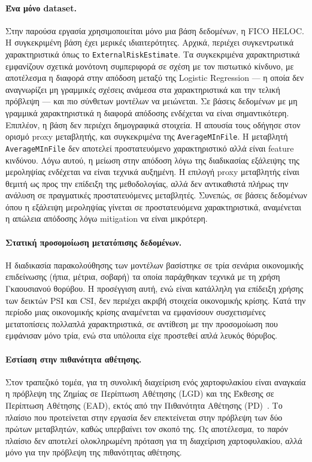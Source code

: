\paragraph{Ένα μόνο dataset.}
Στην παρούσα εργασία χρησιμοποιείται μόνο μια βάση δεδομένων,
η FICO HELOC. Η συγκεκριμένη βάση έχει μερικές ιδιαιτερότητες.
Αρχικά, περιέχει συγκεντρωτικά χαρακτηριστικά όπως το
\texttt{ExternalRiskEstimate}. Τα συγκεκριμένα χαρακτηριστικά
εμφανίζουν σχετικά μονότονη συμπεριφορά σε σχέση με τον
πιστωτικό κίνδυνο, με αποτέλεσμα η διαφορά στην απόδοση μεταξύ
της Logistic Regression --- η οποία δεν αναγνωρίζει μη γραμμικές
σχέσεις ανάμεσα στα χαρακτηριστικά και την τελική πρόβλεψη ---
και πιο σύνθετων μοντέλων να μειώνεται. Σε βάσεις δεδομένων με
μη γραμμικά χαρακτηριστικά η διαφορά απόδοσης ενδέχεται να είναι
σημαντικότερη. Επιπλέον, η βάση δεν περιέχει δημογραφικά στοιχεία.
Η απουσία τους οδήγησε στον ορισμό proxy μεταβλητής, και
συγκεκριμένα της \texttt{AverageMInFile}. Η μεταβλητή
\texttt{AverageMInFile} δεν αποτελεί προστατευόμενο χαρακτηριστικό
αλλά είναι feature κινδύνου. Λόγω αυτού, η μείωση στην απόδοση
λόγω της διαδικασίας εξάλειψης της μεροληψίας ενδέχεται να είναι
τεχνικά αυξημένη. Η επιλογή proxy μεταβλητής είναι θεμιτή ως προς
την επίδειξη της μεθοδολογίας, αλλά δεν αντικαθιστά πλήρως την
ανάλυση σε πραγματικές προστατευόμενες μεταβλητές. Συνεπώς, σε
βάσεις δεδομένων όπου η εξάλειψη μεροληψίας γίνεται σε
προστατευόμενα χαρακτηριστικά, αναμένεται η απώλεια απόδοσης
λόγω mitigation να είναι μικρότερη.

\paragraph{Στατική προσομοίωση μετατόπισης δεδομένων.}
Η διαδικασία παρακολούθησης των μοντέλων βασίστηκε σε τρία
σενάρια οικονομικής επιδείνωσης (ήπια, μέτρια, σοβαρή) τα οποία
παράχθηκαν τεχνικά με τη χρήση Γκαουσιανού θορύβου. Η προσέγγιση
αυτή, ενώ είναι κατάλληλη για επίδειξη χρήσης των δεικτών PSI και
CSI, δεν περιέχει ακριβή στοιχεία οικονομικής κρίσης. Κατά την
περίοδο μιας οικονομικής κρίσης αναμένεται να εμφανίσουν
συσχετισμένες μετατοπίσεις πολλαπλά χαρακτηριστικά, σε αντίθεση
με την προσομοίωση που εμφάνισαν μόνο τρία, ενώ στα υπόλοιπα
είχε προστεθεί απλά λευκός θόρυβος.

\paragraph{Εστίαση στην πιθανότητα αθέτησης.}
Στον τραπεζικό τομέα, για τη συνολική διαχείριση ενός
χαρτοφυλακίου είναι αναγκαία η πρόβλεψη της Ζημίας σε Περίπτωση
Αθέτησης (LGD) και της Έκθεσης σε Περίπτωση Αθέτησης (EAD),
εκτός από την Πιθανότητα Αθέτησης (PD)~\citep{mcneil2015}. Το
πλαίσιο που προτείνεται στην εργασία δεν επεκτείνεται στην
πρόβλεψη των δύο πρώτων μεταβλητών, καθώς υπερβαίνει τον σκοπό
της. Ως αποτέλεσμα, το παρόν πλαίσιο δεν αποτελεί ολοκληρωμένη
πρόταση για τη διαχείριση χαρτοφυλακίου, αλλά μόνο για την
πρόβλεψη της πιθανότητας αθέτησης.

